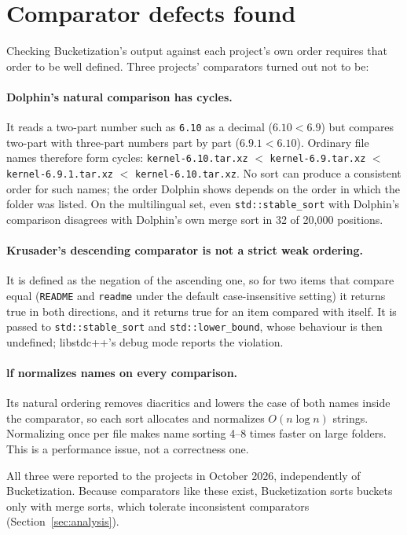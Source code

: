 \documentclass[11pt]{article}
\theoremstyle{definition}
\begin{document}
\section{Comparator defects found}\label{sec:defects}

Checking Bucketization's output against each project's own order requires that
order to be well defined. Three projects' comparators turned out not to be:

\paragraph{Dolphin's natural comparison has cycles.} It reads a two-part
number such as \texttt{6.10} as a decimal ($6.10 < 6.9$) but compares two-part
with three-part numbers part by part ($6.9.1 < 6.10$). Ordinary file names
therefore form cycles:
\texttt{kernel-6.10.tar.xz} $<$ \texttt{kernel-6.9.tar.xz} $<$
\texttt{kernel-6.9.1.tar.xz} $<$ \texttt{kernel-6.10.tar.xz}.
No sort can produce a consistent order for such names; the order Dolphin shows
depends on the order in which the folder was listed. On the multilingual set,
even \texttt{std::stable\_sort} with Dolphin's comparison disagrees with
Dolphin's own merge sort in 32 of 20{,}000 positions.

\paragraph{Krusader's descending comparator is not a strict weak ordering.}
It is defined as the negation of the ascending one, so for two items that
compare equal (\texttt{README} and \texttt{readme} under the default
case-insensitive setting) it returns true in both directions, and it returns
true for an item compared with itself. It is passed to \texttt{std::stable\_sort}
and \texttt{std::lower\_bound}, whose behaviour is then undefined; libstdc++'s
debug mode reports the violation.

\paragraph{lf normalizes names on every comparison.} Its natural ordering
removes diacritics and lowers the case of both names inside the comparator, so
each sort allocates and normalizes $O(n\log n)$ strings. Normalizing once per
file makes name sorting 4--8 times faster on large folders. This is a
performance issue, not a correctness one.

All three were reported to the projects in October 2026, independently of
Bucketization. Because comparators like these exist, Bucketization sorts buckets
only with merge sorts, which tolerate inconsistent comparators
(Section~\ref{sec:analysis}).
\end{document}

